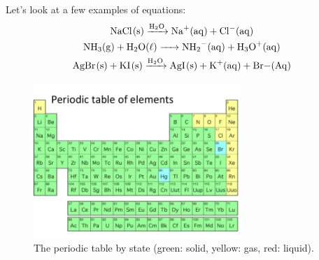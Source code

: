 \documentclass[a4paper]{memoir}
\begin{document}
Let's look at a few examples of equations:
\begin{gather}
  \ce{NaCl(s) ->[H2O] Na+(aq) + Cl-(aq)}\\
  \ce{NH3(g) + H2O(\ell) -> NH2-(aq) + H3O+(aq)}\\
  \ce{AgBr(s) + KI(s) ->[H2O] AgI(s) + K+(aq) + Br-(Aq)}
\end{gather}

\begin{figure}
  \centering
  \includegraphics[width=0.7\textwidth]{ptable2}
  \caption{The periodic table by state (green: solid, yellow: gas, red: liquid).\label{fig:ptable2}}
\end{figure}
\end{document}

